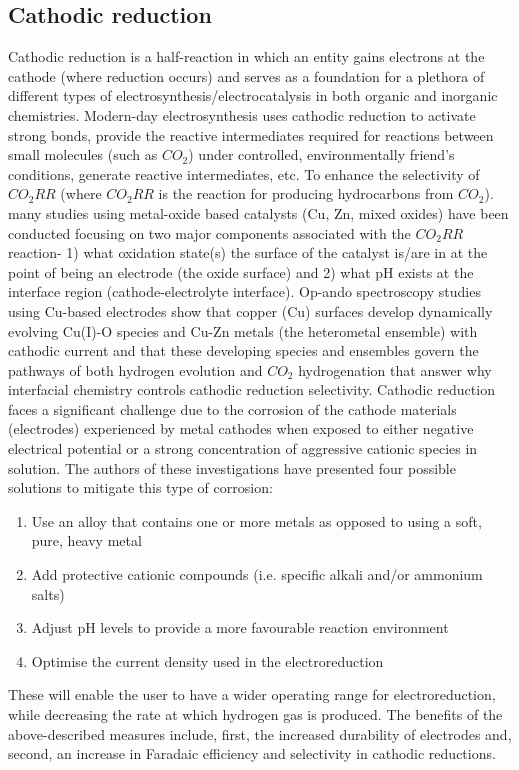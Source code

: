 \documentclass[12pt,a4paper]{report}
\begin{document}
	\subsection{Cathodic reduction}
	Cathodic reduction is a half-reaction in which an entity gains electrons at the cathode (where reduction occurs) and serves as a foundation for a plethora of different types of electrosynthesis/electrocatalysis in both organic and inorganic chemistries. \cite{PLETCHER201597} Modern-day electrosynthesis uses cathodic reduction to activate strong bonds, provide the reactive intermediates required for reactions between small molecules (such as $CO_2$) under controlled, environmentally friend's conditions, generate reactive intermediates, etc. To enhance the selectivity of $CO_2RR$ (where $CO_2RR$ is the reaction for producing hydrocarbons from $CO_2$). \cite{Lei2009}many studies using metal-oxide based catalysts (Cu, Zn, mixed oxides) have been conducted focusing on two major components associated with the $CO_2RR$ reaction- 1) what oxidation state(s) the surface of the catalyst is/are in at the point of being an electrode (the oxide surface) and 2) what pH exists at the interface region (cathode-electrolyte interface). Op-ando spectroscopy studies using Cu-based electrodes show that copper (Cu) surfaces develop dynamically evolving Cu(I)-O species and Cu-Zn metals (the heterometal ensemble) with cathodic current and that these developing species and ensembles govern the pathways of both hydrogen evolution and $CO_2$ hydrogenation that answer why interfacial chemistry controls cathodic reduction selectivity.
	Cathodic reduction faces a significant challenge due to the corrosion of the cathode materials (electrodes) experienced by metal cathodes when exposed to either negative electrical potential or a strong concentration of aggressive cationic species in solution.\cite{Wirtanen2021}  The authors of these investigations have presented four possible solutions to mitigate this type of corrosion: 
	\begin{enumerate} 
		\item {Use an alloy that contains one or more metals as opposed to using a soft, pure, heavy metal} 
		\item {Add protective cationic compounds (i.e. specific alkali and/or ammonium salts)}
		\item {Adjust pH levels to provide a more favourable reaction environment}
		\item {Optimise the current density used in the electroreduction} 
	\end{enumerate}	
	These will enable the user to have a wider operating range for electroreduction, while decreasing the rate at which hydrogen gas is produced. The benefits of the above-described measures include, first, the increased durability of electrodes and, second, an increase in Faradaic efficiency and selectivity in cathodic reductions.
	
\end{document}

